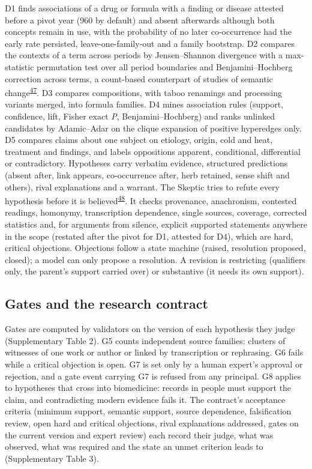 \documentclass[
]{article}
\begin{document}
D1 finds associations of a drug or formula with a finding or disease
attested before a pivot year (960 by default) and absent afterwards
although both concepts remain in use, with the probability of no later
co-occurrence had the early rate persisted, leave-one-family-out and a
family bootstrap. D2 compares the contexts of a term across periods by
Jensen--Shannon divergence with a max-statistic permutation test over
all period boundaries and Benjamini--Hochberg correction across terms, a
count-based counterpart of studies of semantic
change\textsuperscript{\protect\hyperlink{ref-hamilton2016diachronic}{47}}.
D3 compares compositions, with taboo renamings and processing variants
merged, into formula families. D4 mines association rules (support,
confidence, lift, Fisher exact \emph{P}, Benjamini--Hochberg) and ranks
unlinked candidates by Adamic--Adar on the clique expansion of positive
hyperedges only. D5 compares claims about one subject on etiology,
origin, cold and heat, treatment and findings, and labels oppositions
apparent, conditional, differential or contradictory. Hypotheses carry
verbatim evidence, structured predictions (absent after, link appears,
co-occurrence after, herb retained, sense shift and others), rival
explanations and a warrant. The Skeptic tries to refute every hypothesis
before it is
believed\textsuperscript{\protect\hyperlink{ref-popper1959logic}{48}}.
It checks provenance, anachronism, contested readings, homonymy,
transcription dependence, single sources, coverage, corrected statistics
and, for arguments from silence, explicit supported statements anywhere
in the scope (restated after the pivot for D1, attested for D4), which
are hard, critical objections. Objections follow a state machine
(raised, resolution proposed, closed); a model can only propose a
resolution. A revision is restricting (qualifiers only, the parent's
support carried over) or substantive (it needs its own support).

\hypertarget{gates-and-the-research-contract}{%
\subsection{Gates and the research
contract}\label{gates-and-the-research-contract}}

Gates are computed by validators on the version of each hypothesis they
judge (Supplementary Table 2). G5 counts independent source families:
clusters of witnesses of one work or author or linked by transcription
or rephrasing. G6 fails while a critical objection is open. G7 is set
only by a human expert's approval or rejection, and a gate event
carrying G7 is refused from any principal. G8 applies to hypotheses that
cross into biomedicine: records in people must support the claim, and
contradicting modern evidence fails it. The contract's acceptance
criteria (minimum support, semantic support, source dependence,
falsification review, open hard and critical objections, rival
explanations addressed, gates on the current version and expert review)
each record their judge, what was observed, what was required and the
state an unmet criterion leads to (Supplementary Table 3).
\end{document}
